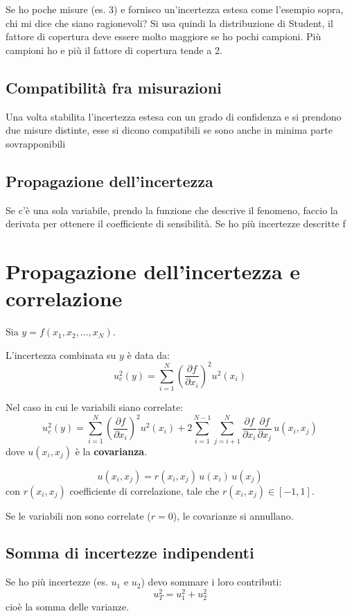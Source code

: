 Se ho poche misure (es. 3) e fornisco un'incertezza estesa come l'esempio sopra, chi mi dice che siano ragionevoli? Si usa quindi la distribuzione di Student, il fattore di copertura deve essere molto maggiore se ho pochi campioni. Più campioni ho e più il fattore di copertura tende a 2.

\subsection{Compatibilità fra misurazioni}
Una volta stabilita l'incertezza estesa con un grado di confidenza e si prendono due misure distinte, esse si dicono compatibili se sono anche in minima parte sovrapponibili

\subsection{Propagazione dell'incertezza}
Se c'è una sola variabile, prendo la funzione che descrive il fenomeno, faccio la derivata per ottenere il coefficiente di sensibilità. Se ho più incertezze descritte f

\section{Propagazione dell’incertezza e correlazione}

Sia $y = f(x_1, x_2, \ldots, x_N)$.

L’incertezza combinata su $y$ è data da:
\[
u_c^2(y) = \sum_{i=1}^N \left( \frac{\partial f}{\partial x_i} \right)^2 u^2(x_i)
\]

Nel caso in cui le variabili siano correlate:
\[
u_c^2(y) = \sum_{i=1}^N \left( \frac{\partial f}{\partial x_i} \right)^2 u^2(x_i)
 + 2\sum_{i=1}^{N-1} \sum_{j=i+1}^{N} \frac{\partial f}{\partial x_i} \frac{\partial f}{\partial x_j} \, u(x_i,x_j)
\]
dove $u(x_i,x_j)$ è la \textbf{covarianza}.

\[
u(x_i,x_j) = r(x_i,x_j) \, u(x_i)\,u(x_j)
\]
con $r(x_i,x_j)$ coefficiente di correlazione, tale che $r(x_i,x_j) \in [-1, 1]$.

\vspace{1em}
\noindent
Se le variabili non sono correlate ($r = 0$), le covarianze si annullano.

\subsection{Somma di incertezze indipendenti}
Se ho più incertezze (es. $u_1$ e $u_2$) devo sommare i loro contributi:
\[
u_T^2 = u_1^2 + u_2^2
\]
cioè la somma delle varianze.

